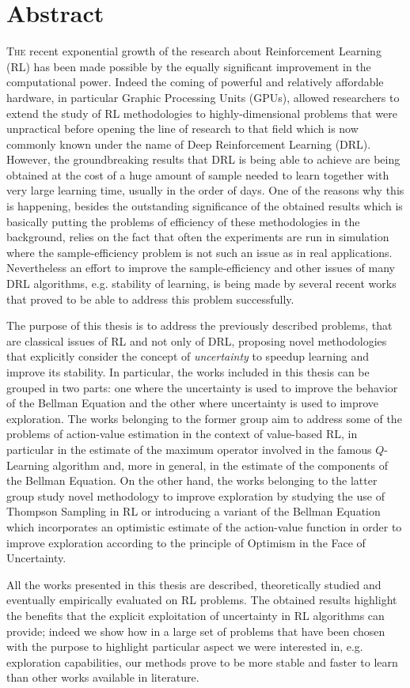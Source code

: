 \chapter*{Abstract}
\lettrine{T}{he} recent exponential growth of the research about Reinforcement Learning (RL) has been made possible by the equally significant improvement in the computational power. Indeed the coming of powerful and relatively affordable hardware, in particular Graphic Processing Units (GPUs), allowed researchers to extend the study of RL methodologies to highly-dimensional problems that were unpractical before opening the line of research to that field which is now commonly known under the name of Deep Reinforcement Learning (DRL). However, the groundbreaking results that DRL is being able to achieve are being obtained at the cost of a huge amount of sample needed to learn together with very large learning time, usually in the order of days. One of the reasons why this is happening, besides the outstanding significance of the obtained results which is basically putting the problems of efficiency of these methodologies in the background, relies on the fact that often the experiments are run in simulation where the sample-efficiency problem is not such an issue as in real applications. Nevertheless an effort to improve the sample-efficiency and other issues of many DRL algorithms, e.g. stability of learning, is being made by several recent works that proved to be able to address this problem successfully.

The purpose of this thesis is to address the previously described problems, that are classical issues of RL and not only of DRL, proposing novel methodologies that explicitly consider the concept of \textit{uncertainty} to speedup learning and improve its stability. In particular, the works included in this thesis can be grouped in two parts: one where the uncertainty is used to improve the behavior of the Bellman Equation and the other where uncertainty is used to improve exploration. The works belonging to the former group aim to address some of the problems of action-value estimation in the context of value-based RL, in particular in the estimate of the maximum operator involved in the famous $Q$-Learning algorithm and, more in general, in the estimate of the components of the Bellman Equation. On the other hand, the works belonging to the latter group study novel methodology to improve exploration by studying the use of Thompson Sampling in RL or introducing a variant of the Bellman Equation which incorporates an optimistic estimate of the action-value function in order to improve exploration according to the principle of Optimism in the Face of Uncertainty.

All the works presented in this thesis are described, theoretically studied and eventually empirically evaluated on RL problems. The obtained results highlight the benefits that the explicit exploitation of uncertainty in RL algorithms can provide; indeed we show how in a large set of problems that have been chosen with the purpose to highlight particular aspect we were interested in, e.g. exploration capabilities, our methods prove to be more stable and faster to learn than other works available in literature.
